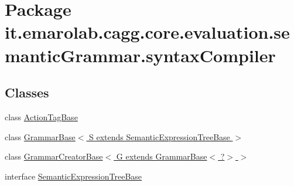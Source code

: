 \hypertarget{namespaceit_1_1emarolab_1_1cagg_1_1core_1_1evaluation_1_1semanticGrammar_1_1syntaxCompiler}{\section{Package it.\-emarolab.\-cagg.\-core.\-evaluation.\-semantic\-Grammar.\-syntax\-Compiler}
\label{namespaceit_1_1emarolab_1_1cagg_1_1core_1_1evaluation_1_1semanticGrammar_1_1syntaxCompiler}
}
\subsection*{Classes}
\begin{DoxyCompactItemize}
\item 
class \hyperlink{classit_1_1emarolab_1_1cagg_1_1core_1_1evaluation_1_1semanticGrammar_1_1syntaxCompiler_1_1ActionTagBase}{Action\-Tag\-Base}
\item 
class \hyperlink{classit_1_1emarolab_1_1cagg_1_1core_1_1evaluation_1_1semanticGrammar_1_1syntaxCompiler_1_1Grammac6e795d7438edf939adda9d5323937f2}{Grammar\-Base$<$ S extends Semantic\-Expression\-Tree\-Base $>$}
\item 
class \hyperlink{classit_1_1emarolab_1_1cagg_1_1core_1_1evaluation_1_1semanticGrammar_1_1syntaxCompiler_1_1Gramma1bf252c3f4def91ad707660fdfe73d0a}{Grammar\-Creator\-Base$<$ G extends Grammar\-Base$<$ ?$>$ $>$}
\item 
interface \hyperlink{interfaceit_1_1emarolab_1_1cagg_1_1core_1_1evaluation_1_1semanticGrammar_1_1syntaxCompiler_1_1SemanticExpressionTreeBase}{Semantic\-Expression\-Tree\-Base}
\end{DoxyCompactItemize}
